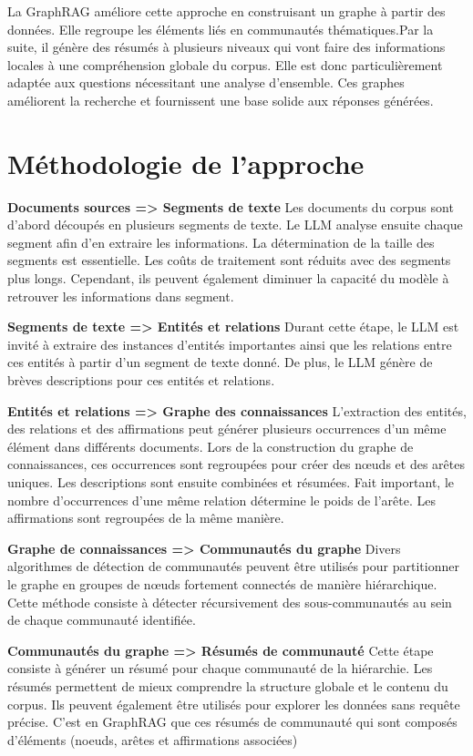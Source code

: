 \documentclass[12pt,a4paper]{report}
\begin{document}
La GraphRAG améliore cette approche en construisant un graphe à partir des données. Elle regroupe les 
éléments liés en communautés thématiques.Par la suite, il génère des résumés à plusieurs niveaux qui vont faire 
des informations locales à une compréhension globale du corpus. Elle est donc particulièrement adaptée 
aux questions nécessitant une analyse d'ensemble. Ces graphes améliorent la recherche et fournissent 
une base solide aux réponses générées.

\section{Méthodologie de l'approche}

\textbf{Documents sources => Segments de texte}
Les documents du corpus sont d'abord découpés en plusieurs segments de texte. Le LLM analyse ensuite 
chaque segment afin d'en extraire les informations. La détermination de la taille des segments est essentielle.
Les coûts de traitement sont réduits avec des segments plus longs. Cependant, ils peuvent également diminuer 
la capacité du modèle à retrouver les informations dans segment.

\textbf{Segments de texte => Entités et relations}
Durant cette étape, le LLM est invité à extraire des instances d'entités importantes ainsi que les relations
entre ces entités à partir d'un segment de texte donné. De plus, le LLM génère de brèves descriptions
pour ces entités et relations.

\textbf{Entités et relations => Graphe des connaissances}
L'extraction des entités, des relations et des affirmations peut générer plusieurs occurrences d'un même 
élément dans différents documents. Lors de la construction du graphe de connaissances, ces occurrences 
sont regroupées pour créer des nœuds et des arêtes uniques. Les descriptions sont ensuite combinées et 
résumées. Fait important, le nombre d'occurrences d'une même relation détermine le poids de l'arête. 
Les affirmations sont regroupées de la même manière.

\textbf{Graphe de connaissances => Communautés du graphe}
Divers algorithmes de détection de communautés peuvent être utilisés pour partitionner le graphe en 
groupes de nœuds fortement connectés de manière hiérarchique. Cette méthode consiste à détecter récursivement 
des sous-communautés au sein de chaque communauté identifiée.


\textbf{Communautés du graphe => Résumés de communauté}
Cette étape consiste à générer un résumé pour chaque communauté de la hiérarchie. Les résumés permettent de 
mieux comprendre la structure globale et le contenu du corpus. Ils peuvent également être utilisés pour 
explorer les données sans requête précise. C'est en GraphRAG que ces résumés de communauté qui sont composés
d'éléments (noeuds, arêtes et affirmations associées)
\end{document}
